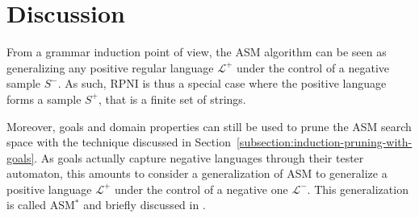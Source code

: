 \section{Discussion\label{section:inductive-discussion}}

From a grammar induction point of view, the ASM algorithm can be seen as generalizing any positive regular language $\mathcal{L}^+$ under the control of a negative sample $S^-$. As such, RPNI is thus a special case where the positive language forms a sample $S^+$, that is a finite set of strings.

Moreover, goals and domain properties can still be used to prune the ASM search space with the technique discussed in Section~\ref{subsection:induction-pruning-with-goals}. As goals actually capture negative languages through their tester automaton, this amounts to consider a generalization of ASM to generalize a positive language $\mathcal{L}^+$ under the control of a negative one $\mathcal{L}^-$. This generalization is called ASM$^*$ and briefly discussed in \cite{Lambeau:2008}.


